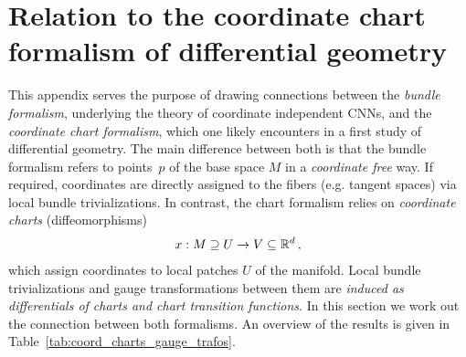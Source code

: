 

\section{Relation to the coordinate chart formalism of differential geometry}
\label{apx:coordinate_bases}


This appendix serves the purpose of drawing connections between the \emph{bundle formalism}, underlying the theory of coordinate independent CNNs, and the \emph{coordinate chart formalism}, which one likely encounters in a first study of differential geometry.
The main difference between both is that the bundle formalism refers to points~$p$ of the base space $M$ in a \emph{coordinate free} way.
If required, coordinates are directly assigned to the fibers (e.g. tangent spaces) via local bundle trivializations.
In contrast, the chart formalism relies on \emph{coordinate charts} (diffeomorphisms)
\begin{align}
    x: M \supseteq U \to V \subseteq \mathbb{R}^d \,,
\end{align}
which assign coordinates to local patches $U$ of the manifold.
Local bundle trivializations and gauge transformations between them are \emph{induced as differentials of charts and chart transition functions}.
In this section we work out the connection between both formalisms.
An overview of the results is given in Table~\ref{tab:coord_charts_gauge_trafos}.


\etocsettocstyle{}{} %
\localtableofcontents


